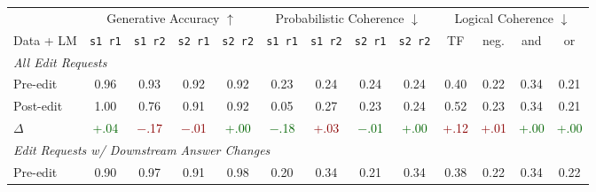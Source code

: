 \documentclass[11pt,a4paper]{article}
\begin{document}
\begin{table}
\small
\centering
\begin{tabular}{lcccccccccccc}
\hline
 & \multicolumn{4}{c}{Generative Accuracy $\uparrow$} & \multicolumn{4}{c}{Probabilistic Coherence $\downarrow$} & \multicolumn{4}{c}{Logical Coherence $\downarrow$} \\ 
 \cmidrule(lr){2-5} \cmidrule(lr){6-9} \cmidrule(lr){10-13}
 \hspace{-4pt} Data + LM & \texttt{s1 \hspace{-7pt} r1} & \texttt{s1 \hspace{-2pt}r2} & \texttt{s2 \hspace{-2pt}r1} & \texttt{s2 \hspace{-2pt}r2} & \texttt{s1 \hspace{-2pt}r1} & \texttt{s1\hspace{-2pt} r2} & \texttt{s2 \hspace{-2pt}r1} & \texttt{s2\hspace{-2pt} r2} & TF & neg. & and & or \\
 \hline
 \multicolumn{12}{l}{\hspace{-1pt}\textit{All Edit Requests}} \\ 
 \hspace{2pt} Pre-edit & 0.96 & 0.93 & 0.92 & 0.92 & 0.23 & 0.24 & 0.24 & 0.24 & 0.40 & 0.22 & 0.34 & 0.21 \\
 \hspace{2pt} Post-edit & 1.00 & 0.76 & 0.91 & 0.92 & 0.05 & 0.27 & 0.23 & 0.24 & 0.52 & 0.23 & 0.34 & 0.21 \\ 
 \hspace{14pt} $\Delta$ & \textcolor{darkgreen}{+.04} & \textcolor{darkred}{$-$.17}\hspace{1pt} & \textcolor{darkred}{$-$.01}\hspace{1pt} & \textcolor{darkgreen}{+.00} & \textcolor{darkgreen}{$-$.18}\hspace{1pt} & \textcolor{darkred}{+.03} & \textcolor{darkgreen}{$-$.01} & \textcolor{darkgreen}{+.00} & \textcolor{darkred}{+.12} & \textcolor{darkred}{+.01} & \textcolor{darkgreen}{+.00} & \textcolor{darkgreen}{+.00} \\
 \hline
\multicolumn{12}{l}{\hspace{-1pt}\textit{Edit Requests w/ Downstream Answer Changes}} \\
 \hspace{2pt} Pre-edit & 0.90 & 0.97 & 0.91 & 0.98 & 0.20 & 0.34 & 0.21 & 0.34 & 0.38 & 0.22 & 0.34 & 0.22 \\

\end{tabular}
\end{table}
\end{document}
